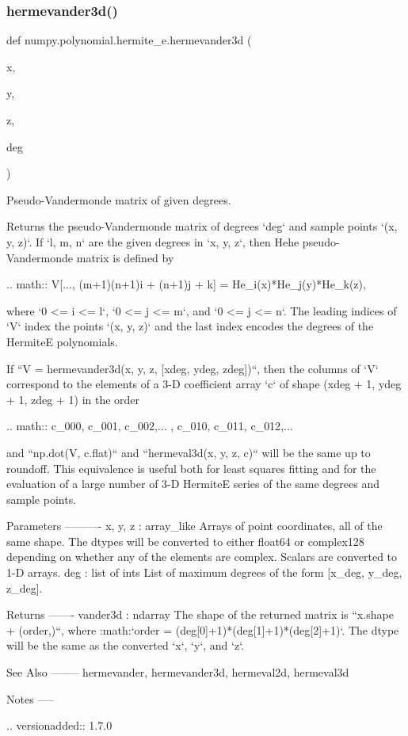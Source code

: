 \subsubsection{\texorpdfstring{hermevander3d()}{hermevander3d()}}
{\footnotesize\ttfamily def numpy.\+polynomial.\+hermite\+\_\+e.\+hermevander3d (\begin{DoxyParamCaption}\item[{}]{x,  }\item[{}]{y,  }\item[{}]{z,  }\item[{}]{deg }\end{DoxyParamCaption})}

\begin{DoxyVerb}Pseudo-Vandermonde matrix of given degrees.

Returns the pseudo-Vandermonde matrix of degrees `deg` and sample
points `(x, y, z)`. If `l, m, n` are the given degrees in `x, y, z`,
then Hehe pseudo-Vandermonde matrix is defined by

.. math:: V[..., (m+1)(n+1)i + (n+1)j + k] = He_i(x)*He_j(y)*He_k(z),

where `0 <= i <= l`, `0 <= j <= m`, and `0 <= j <= n`.  The leading
indices of `V` index the points `(x, y, z)` and the last index encodes
the degrees of the HermiteE polynomials.

If ``V = hermevander3d(x, y, z, [xdeg, ydeg, zdeg])``, then the columns
of `V` correspond to the elements of a 3-D coefficient array `c` of
shape (xdeg + 1, ydeg + 1, zdeg + 1) in the order

.. math:: c_{000}, c_{001}, c_{002},... , c_{010}, c_{011}, c_{012},...

and  ``np.dot(V, c.flat)`` and ``hermeval3d(x, y, z, c)`` will be the
same up to roundoff. This equivalence is useful both for least squares
fitting and for the evaluation of a large number of 3-D HermiteE
series of the same degrees and sample points.

Parameters
----------
x, y, z : array_like
    Arrays of point coordinates, all of the same shape. The dtypes will
    be converted to either float64 or complex128 depending on whether
    any of the elements are complex. Scalars are converted to 1-D
    arrays.
deg : list of ints
    List of maximum degrees of the form [x_deg, y_deg, z_deg].

Returns
-------
vander3d : ndarray
    The shape of the returned matrix is ``x.shape + (order,)``, where
    :math:`order = (deg[0]+1)*(deg[1]+1)*(deg[2]+1)`.  The dtype will
    be the same as the converted `x`, `y`, and `z`.

See Also
--------
hermevander, hermevander3d, hermeval2d, hermeval3d

Notes
-----

.. versionadded:: 1.7.0\end{DoxyVerb}
 \mbox{\label{namespacenumpy_1_1polynomial_1_1hermite__e_a95c6dd64af2da97fc03d65fc83a7ad29}} 

